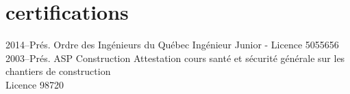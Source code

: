 \documentclass[]{friggos-cv} %
\begin{document}

\section{certifications}
  \begin{entrylist}
    \entryFULL
      {2014--Prés.}
      {Ordre des Ingénieurs du Québec}
      {}
      {Ingénieur Junior - Licence 5055656}
      {}
    \entryFULL
      {2003--Prés.}
      {ASP Construction}
      {}
      {Attestation cours santé et sécurité générale sur les chantiers de construction\\Licence 98720}
      {}
\end{entrylist}

%


\end{document}

